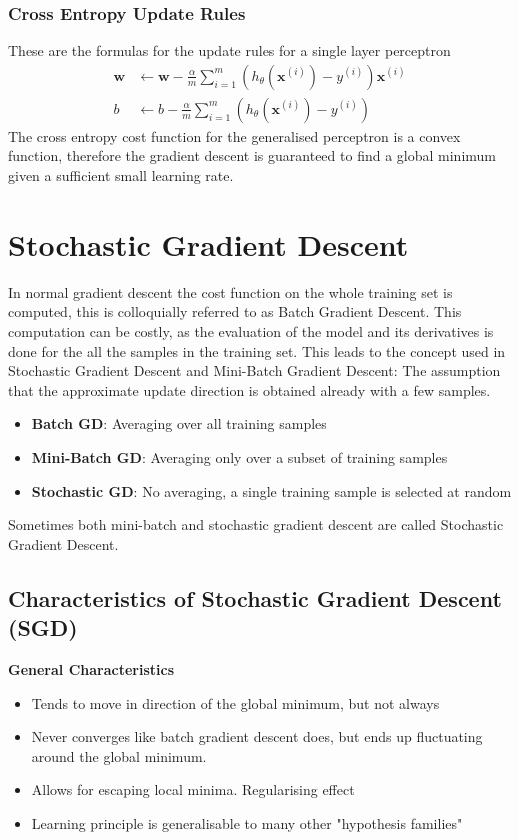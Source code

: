 \documentclass[11pt]{article}
\begin{document}
\subsubsection{Cross Entropy Update Rules}
These are the formulas for the update rules for a single layer perceptron
\begin{align}
	\textbf{w} &\leftarrow \textbf{w} - \frac{\alpha}{m} \sum_{i=1}^{m}\left( h_\theta(\textbf{x}^{(i)}) - y^{(i)} \right) \textbf{x}^{(i)}\\
	b &\leftarrow b - \frac{\alpha}{m} \sum_{i=1}^{m}\left( h_\theta(\textbf{x}^{(i)}) - y^{(i)} \right)
\end{align}
\noindent
The cross entropy cost function for the generalised perceptron is a convex function, therefore the gradient descent is guaranteed to find a global minimum given a sufficient small learning rate.

\section{Stochastic Gradient Descent}
In normal gradient descent the cost function on the whole training set is computed, this is colloquially referred to as Batch Gradient Descent. This computation can be costly, as the evaluation of the model and its derivatives is done for the all the samples in the training set. This leads to the concept used in Stochastic Gradient Descent and Mini-Batch Gradient Descent: The assumption that the approximate update direction is obtained already with a few samples.

\begin{itemize}[label=-]
	\item \textbf{Batch GD}: Averaging over all training samples
	\item \textbf{Mini-Batch GD}: Averaging only over a subset of training samples
	\item \textbf{Stochastic GD}: No averaging, a single training sample is selected at random
\end{itemize}

Sometimes both mini-batch and stochastic gradient descent are called Stochastic Gradient Descent.

\subsection{Characteristics of Stochastic Gradient Descent (SGD)}
\textbf{General Characteristics}
\begin{itemize}
	\item Tends to move in direction of the global minimum, but not always
	\item Never converges like batch gradient descent does, but ends up fluctuating around the global minimum.
	\item Allows for escaping local minima. Regularising effect
	\item Learning principle is generalisable to many other "hypothesis families"
\end{itemize}
\end{document}
